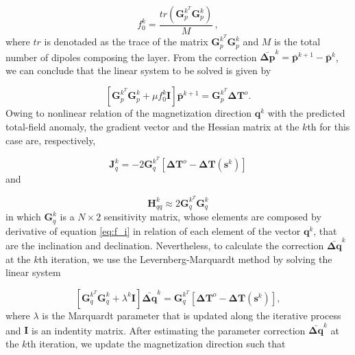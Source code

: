 \begin{equation}
f_{0}^{k} = \dfrac{tr(\mathbf{G}_{p}^{k^T} \mathbf{G}_{p}^{k})}{M} \, ,
\label{eq:norm_factor}
\end{equation}
where $tr$ is denotaded as the trace of the matrix $\mathbf{G}_{p}^{k^T} \mathbf{G}_{p}^{k}$ and $M$ is the total number of dipoles composing the layer. From the correction $\bar{\mathbf{\Delta p}}^{k} = \bar{\mathbf{p}}^{k+1} - \bar{\mathbf{p}}^{k}$, we can conclude that the linear system to be solved is given by

\begin{equation}
\left[ \mathbf{G}_{p}^{k^T} \mathbf{G}_{p}^{k} + \mu f_{0}^{k} \mathbf{I} \right] \bar{\mathbf{p}}^{k+1} = \mathbf{G}_{p}^{k^T} \mathbf{\Delta T}^o.
\label{eq:linear_sys_p}
\end{equation} 
Owing to nonlinear relation of the magnetization direction $\mathbf{q}^k$ with the predicted total-field anomaly, the gradient vector and the Hessian matrix at the $k$th for this case are, respectively,

\begin{equation}
\mathbf{J}_{q}^{k} = -2 \mathbf{G}_{q}^{k^T} [ \mathbf{\Delta T}^o -  \mathbf{\Delta T} (\mathbf{s}^k) ] 
\label{eq:grad_q}
\end{equation}   
and   

\begin{equation}
\mathbf{H}_{qq}^{k} \approx 2 \mathbf{G}_{q}^{k^T} \mathbf{G}_{q}^{k} 
\label{eq:hess_q}
\end{equation}
in which $\mathbf{G}_q^k$ is a $N \times 2$ sensitivity matrix, whose elements are composed by derivative of equation \ref{eq:f_i} in relation of each element of the vector $\mathbf{q}^k$, that are the inclination and declination. Nevertheless, to calculate the correction $\bar{\mathbf{\Delta q}}^{k}$ at the $k$th iteration, we use the Levernberg-Marquardt method \citep{aster2005} by solving the linear system

\begin{equation}
\left[ \mathbf{G}_{q}^{k^T} \mathbf{G}_{q}^{k} + \lambda^k \mathbf{I} \right] \bar{\mathbf{\Delta q}}^{k} = \mathbf{G}_{q}^{k^T}[ \mathbf{\Delta T}^o -  \mathbf{\Delta T} (\mathbf{s}^k) ],
\label{eq:linear_sys_q}
\end{equation}
where $\lambda$ is the Marquardt parameter that is updated along the iterative process and $\mathbf{I}$ is an indentity matrix. After estimating the parameter correction $\bar{\mathbf{\Delta q}}^{k}$ at the $k$th iteration, we update the magnetization direction such that 

